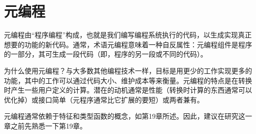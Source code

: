 \chapter{元编程}
元编程由“程序编程”构成，也就是我们编写编程系统执行的代码，以生成实现真正想要的功能的新代码。通常，术语元编程意味着一种自反属性：元编程组件是程序的一部分，其可生成一段代码（即，程序的另一段或不同的代码）。

为什么使用元编程？与大多数其他编程技术一样，目标是用更少的工作实现更多的功能，其中的工作可以通过代码大小、维护成本等来衡量。元编程的特点是在转换时产生一些用户定义的计算。潜在的动机通常是性能（转换时计算的东西通常可以优化掉）或接口简单（元程序通常比它扩展的要短）或两者兼有。

元编程通常依赖于特征和类型函数的概念，如第19章所述。因此，建议在研究这一章之前先熟悉一下第19章。






